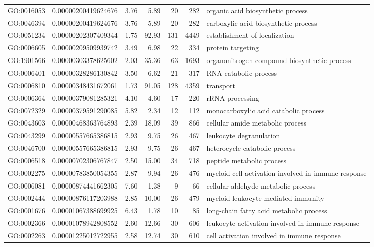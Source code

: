 \documentclass[letterpaper,12pt]{article}
\numberwithin{equation}{appendix}
\begin{document}
\begin{landscape}
{{\begin{longtable}{lrrrrrl}
  GO:0016053 & 0.00000200419624676 & 3.76 & 5.89 & 20 & 282 & organic acid biosynthetic process \\ 
  GO:0046394 & 0.00000200419624676 & 3.76 & 5.89 & 20 & 282 & carboxylic acid biosynthetic process \\ 
  GO:0051234 & 0.00000202307409344 & 1.75 & 92.93 & 131 & 4449 & establishment of localization \\ 
  GO:0006605 & 0.00000209509939742 & 3.49 & 6.98 & 22 & 334 & protein targeting \\ 
  GO:1901566 & 0.00000303378625602 & 2.03 & 35.36 & 63 & 1693 & organonitrogen compound biosynthetic process \\ 
  GO:0006401 & 0.00000328286130842 & 3.50 & 6.62 & 21 & 317 & RNA catabolic process \\ 
  GO:0006810 & 0.00000348431672061 & 1.73 & 91.05 & 128 & 4359 & transport \\ 
  GO:0006364 & 0.00000379081285321 & 4.10 & 4.60 & 17 & 220 & rRNA processing \\ 
  GO:0072329 & 0.00000379591290085 & 5.82 & 2.34 & 12 & 112 & monocarboxylic acid catabolic process \\ 
  GO:0043603 & 0.00000468363764893 & 2.39 & 18.09 & 39 & 866 & cellular amide metabolic process \\ 
  GO:0043299 & 0.00000557665386815 & 2.93 & 9.75 & 26 & 467 & leukocyte degranulation \\ 
  GO:0046700 & 0.00000557665386815 & 2.93 & 9.75 & 26 & 467 & heterocycle catabolic process \\ 
  GO:0006518 & 0.00000702306767847 & 2.50 & 15.00 & 34 & 718 & peptide metabolic process \\ 
  GO:0002275 & 0.00000783850054355 & 2.87 & 9.94 & 26 & 476 & myeloid cell activation involved in immune response \\ 
  GO:0006081 & 0.00000874441662305 & 7.60 & 1.38 & 9 & 66 & cellular aldehyde metabolic process \\ 
  GO:0002444 & 0.00000876117203988 & 2.85 & 10.00 & 26 & 479 & myeloid leukocyte mediated immunity \\ 
  GO:0001676 & 0.00001067388699925 & 6.43 & 1.78 & 10 & 85 & long-chain fatty acid metabolic process \\ 
  GO:0002366 & 0.00001078942808552 & 2.60 & 12.66 & 30 & 606 & leukocyte activation involved in immune response \\ 
  GO:0002263 & 0.00001225012722955 & 2.58 & 12.74 & 30 & 610 & cell activation involved in immune response \\ 

\end{longtable}}}
\end{landscape}
\end{document}
